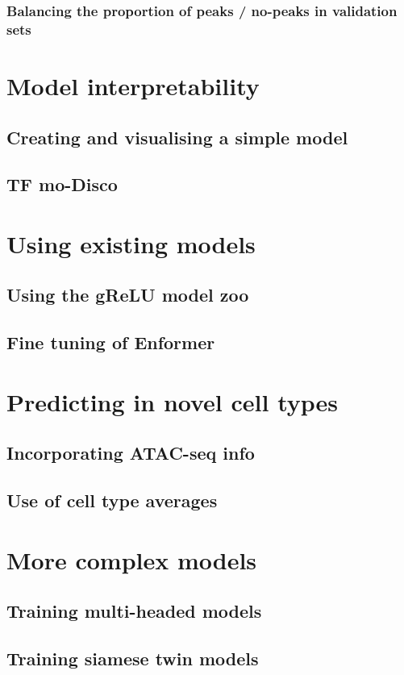 \documentclass[
]{book}
\begin{document}
\section{Balancing the proportion of peaks / no-peaks in validation sets}\label{balancing-the-proportion-of-peaks-no-peaks-in-validation-sets}

\part{Model interpretability}\label{part-model-interpretability}

\chapter{Creating and visualising a simple model}\label{creating-and-visualising-a-simple-model}

\chapter{TF mo-Disco}\label{tf-mo-disco}

\part{Using existing models}\label{part-using-existing-models}

\chapter{Using the gReLU model zoo}\label{using-the-grelu-model-zoo}

\chapter{Fine tuning of Enformer}\label{fine-tuning-of-enformer}

\part{Predicting in novel cell types}\label{part-predicting-in-novel-cell-types}

\chapter{Incorporating ATAC-seq info}\label{incorporating-atac-seq-info}

\chapter{Use of cell type averages}\label{use-of-cell-type-averages}

\part{More complex models}\label{part-more-complex-models}

\chapter{Training multi-headed models}\label{training-multi-headed-models}

\chapter{Training siamese twin models}\label{training-siamese-twin-models}

  
\end{document}
